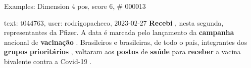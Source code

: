 \begin{frame}{Examples: Dimension 4 pos, score 6, \# 000013}
\footnotesize
\begin{exampleblock}{text: t044763, user: rodrigopacheco, 2023-02-27}
\textbf{Recebi} , nesta segunda, representantes da Pfizer. A data é marcada 
pelo lançamento da \textbf{campanha} nacional de \textbf{vacinação} . 
Brasileiros e brasileiras, de todo o país, integrantes dos \textbf{grupos} 
\textbf{prioritários} , voltaram aos \textbf{postos} de \textbf{saúde} para 
\textbf{receber} a vacina bivalente contra a Covid-19 . 
\end{exampleblock}
\end{frame}
